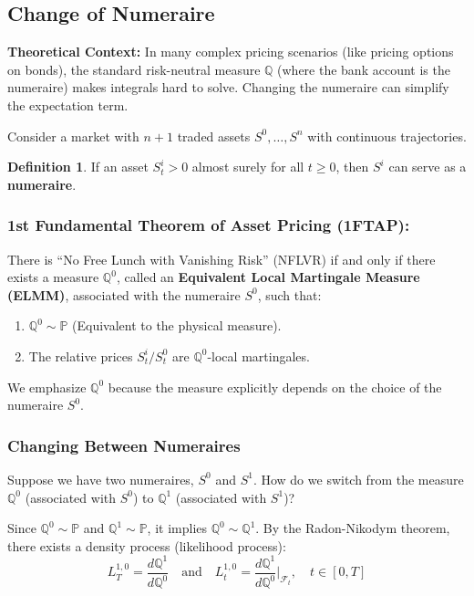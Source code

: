 \documentclass[12pt,a4paper]{article}
\theoremstyle{definition}
\newtheorem{definition}{Definition}[section]
\newcommand{\Q}{\mathbb{Q}}
\newcommand{\Prob}{\mathbb{P}}
\begin{document}
\subsection{Change of Numeraire}

\textbf{Theoretical Context:} In many complex pricing scenarios (like pricing options on bonds), the standard risk-neutral measure $\Q$ (where the bank account is the numeraire) makes integrals hard to solve. Changing the numeraire can simplify the expectation term.

Consider a market with $n+1$ traded assets $S^0, \ldots, S^n$ with continuous trajectories.

\begin{definition}
If an asset $S_t^i > 0$ almost surely for all $t \geq 0$, then $S^i$ can serve as a \textbf{numeraire}.
\end{definition}

\subsubsection{1st Fundamental Theorem of Asset Pricing (1FTAP):}

There is ``No Free Lunch with Vanishing Risk'' (NFLVR) if and only if there exists a measure $\Q^0$, called an \textbf{Equivalent Local Martingale Measure (ELMM)}, associated with the numeraire $S^0$, such that:

\begin{enumerate}
\item $\Q^0 \sim \Prob$ (Equivalent to the physical measure).

\item The relative prices $S_t^i / S_t^0$ are $\Q^0$-local martingales.
\end{enumerate}

We emphasize $\Q^0$ because the measure explicitly depends on the choice of the numeraire $S^0$.

\subsubsection{Changing Between Numeraires}

Suppose we have two numeraires, $S^0$ and $S^1$. How do we switch from the measure $\Q^0$ (associated with $S^0$) to $\Q^1$ (associated with $S^1$)?

Since $\Q^0 \sim \Prob$ and $\Q^1 \sim \Prob$, it implies $\Q^0 \sim \Q^1$. By the Radon-Nikodym theorem, there exists a density process (likelihood process):
\[
L_T^{1,0} = \frac{d\Q^1}{d\Q^0} \quad \text{and} \quad L_t^{1,0} = \frac{d\Q^1}{d\Q^0}\bigg|_{\mathcal{F}_t}, \quad t \in [0,T]
\]
\end{document}
